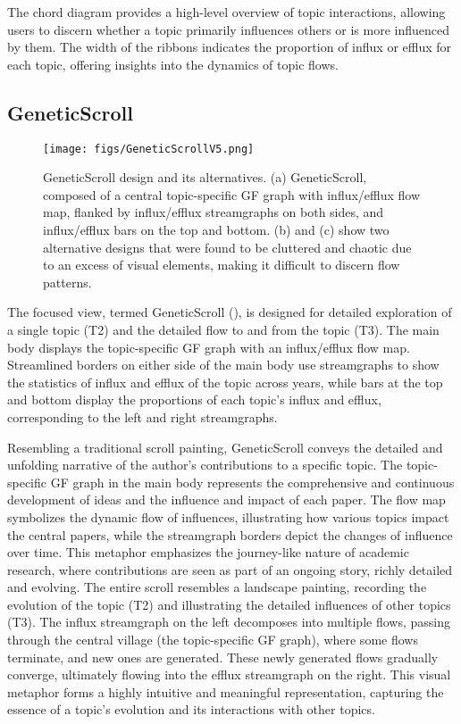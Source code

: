 The chord diagram provides a high-level overview of topic interactions, allowing users to discern whether a topic primarily influences others or is more influenced by them. The width of the ribbons indicates the proportion of influx or efflux for each topic, offering insights into the dynamics of topic flows.


\subsection{GeneticScroll}

\begin{figure}[tb]
  \centering
  \texttt{[image: figs/GeneticScrollV5.png]}
  \caption{%
  	GeneticScroll design and its alternatives. (a) GeneticScroll, composed of a central topic-specific GF graph with influx/efflux flow map, flanked by influx/efflux streamgraphs on both sides, and influx/efflux bars on the top and bottom. (b) and (c) show two alternative designs that were found to be cluttered and chaotic due to an excess of visual elements, making it difficult to discern flow patterns.%
  }
  \label{fig:GeneticScroll}
\end{figure}

The focused view, termed GeneticScroll (), is designed for detailed exploration of a single topic (T2) and the detailed flow to and from the topic (T3). The main body displays the topic-specific GF graph with an influx/efflux flow map. Streamlined borders on either side of the main body use streamgraphs to show the statistics of influx and efflux of the topic across years, while bars at the top and bottom display the proportions of each topic's influx and efflux, corresponding to the left and right streamgraphs.

Resembling a traditional scroll painting, GeneticScroll conveys the detailed and unfolding narrative of the author's contributions to a specific topic. The topic-specific GF graph in the main body represents the comprehensive and continuous development of ideas and the influence and impact of each paper. The flow map symbolizes the dynamic flow of influences, illustrating how various topics impact the central papers, while the streamgraph borders depict the changes of influence over time. This metaphor emphasizes the journey-like nature of academic research, where contributions are seen as part of an ongoing story, richly detailed and evolving. The entire scroll resembles a landscape painting, recording the evolution of the topic (T2) and illustrating the detailed influences of other topics (T3). The influx streamgraph on the left decomposes into multiple flows, passing through the central village (the topic-specific GF graph), where some flows terminate, and new ones are generated. These newly generated flows gradually converge, ultimately flowing into the efflux streamgraph on the right. This visual metaphor forms a highly intuitive and meaningful representation, capturing the essence of a topic's evolution and its interactions with other topics.

